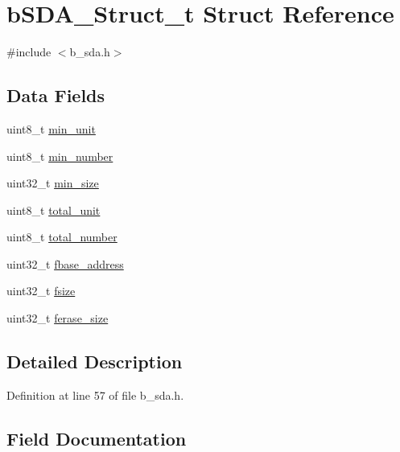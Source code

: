 \hypertarget{structb_s_d_a___struct__t}{}\section{b\+S\+D\+A\+\_\+\+Struct\+\_\+t Struct Reference}
\label{structb_s_d_a___struct__t}


{\ttfamily \#include $<$b\+\_\+sda.\+h$>$}

\subsection*{Data Fields}
\begin{DoxyCompactItemize}
\item 
uint8\+\_\+t \mbox{\hyperlink{structb_s_d_a___struct__t_a34afb089f99ed87b9395389e0c81613e}{min\+\_\+unit}}
\item 
uint8\+\_\+t \mbox{\hyperlink{structb_s_d_a___struct__t_a80a94b0aa4a45d6d345a88b82c1826df}{min\+\_\+number}}
\item 
uint32\+\_\+t \mbox{\hyperlink{structb_s_d_a___struct__t_ac9c8f5dcbc6336fc5342b08634213134}{min\+\_\+size}}
\item 
uint8\+\_\+t \mbox{\hyperlink{structb_s_d_a___struct__t_afcbabe077990d48802adbe3ea84b1e70}{total\+\_\+unit}}
\item 
uint8\+\_\+t \mbox{\hyperlink{structb_s_d_a___struct__t_a702640e2145f0cc10b783f2f5f6d4de2}{total\+\_\+number}}
\item 
uint32\+\_\+t \mbox{\hyperlink{structb_s_d_a___struct__t_a6c38e52234d4b303b56e98deaef5ac37}{fbase\+\_\+address}}
\item 
uint32\+\_\+t \mbox{\hyperlink{structb_s_d_a___struct__t_aa5092484dbc5fc29a229feee0eae1246}{fsize}}
\item 
uint32\+\_\+t \mbox{\hyperlink{structb_s_d_a___struct__t_a164d7d7bc468d06c6c1a99ba17eb3346}{ferase\+\_\+size}}
\end{DoxyCompactItemize}


\subsection{Detailed Description}


Definition at line 57 of file b\+\_\+sda.\+h.



\subsection{Field Documentation}
\mbox{\label{structb_s_d_a___struct__t_a6c38e52234d4b303b56e98deaef5ac37}} 
